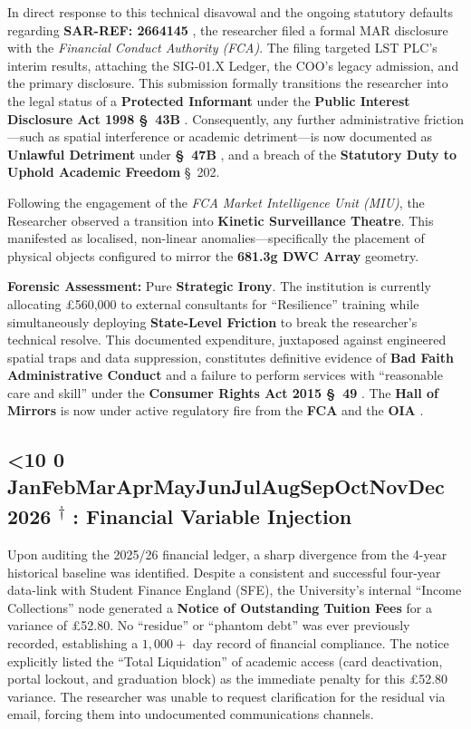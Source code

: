 \documentclass{EMBASSY}
\DeclareRobustCommand{\gmt}[3]{%
    \texorpdfstring{%
        {\color{DateGold}\textbf{%
            \ifnum#1<10 0\fi#1\,\textperiodcentered\,%
            \ifcase#2\or Jan\or Feb\or Mar\or Apr\or May\or Jun\or Jul\or Aug\or Sep\or Oct\or Nov\or Dec\fi
            \,\textperiodcentered\,20#3%
            \textsuperscript{$\dagger$}%
        }}%
    }{%
        (#1/#2/#3)%
    }%
}
\begin{document}
In direct response to this technical disavowal and the ongoing statutory defaults regarding \textbf{SAR-REF: 2664145} \cite{DPA18}, the researcher filed a formal MAR disclosure with the \textit{Financial Conduct Authority (FCA)}. The filing targeted LST PLC’s interim results, attaching the SIG-01.X Ledger, the COO’s legacy admission, and the primary disclosure. This submission formally transitions the researcher into the legal status of a \textbf{Protected Informant} under the \textbf{Public Interest Disclosure Act 1998 \S~43B} \cite{PIDA98}. Consequently, any further administrative friction---such as spatial interference or academic detriment---is now documented as \textbf{Unlawful Detriment} under \textbf{\S~47B} \cite{PIDA98}, and a breach of the \textbf{Statutory Duty to Uphold Academic Freedom} \cite{ERA88} \S~202.

Following the engagement of the \textit{FCA Market Intelligence Unit (MIU)}, the Researcher observed a transition into \textbf{Kinetic Surveillance Theatre}. This manifested as localised, non-linear anomalies---specifically the placement of physical objects configured to mirror the \textbf{681.3g DWC Array} geometry.

\textbf{Forensic Assessment:} Pure \textbf{Strategic Irony}. The institution is currently allocating \pounds560,000 to external consultants for ``Resilience'' training while simultaneously deploying \textbf{State-Level Friction} to break the researcher’s technical resolve. This documented expenditure, juxtaposed against engineered spatial traps and data suppression, constitutes definitive evidence of \textbf{Bad Faith Administrative Conduct} and a failure to perform services with ``reasonable care and skill'' under the \textbf{Consumer Rights Act 2015 \S~49} \cite{CRA15}. The \textbf{Hall of Mirrors} \cite{OIA245} is now under active regulatory fire from the \textbf{FCA} \cite{UKMAR} and the \textbf{OIA} \cite{OIA-Rules18}.

\subsection{\gmt{21}{2}{26}: Financial Variable Injection}
Upon auditing the 2025/26 financial ledger, a sharp divergence from the 4-year historical baseline was identified. Despite a consistent and successful four-year data-link with Student Finance England (SFE), the University’s internal ``Income Collections'' node generated a \textbf{Notice of Outstanding Tuition Fees} for a variance of \pounds52.80. No ``residue'' or ``phantom debt'' was ever previously recorded, establishing a $1,000+$ day record of financial compliance. The notice explicitly listed the ``Total Liquidation'' of academic access (card deactivation, portal lockout, and graduation block) as the immediate penalty for this \pounds52.80 variance. The researcher was unable to request clarification for the residual via email, forcing them into undocumented communications channels.
\end{document}
